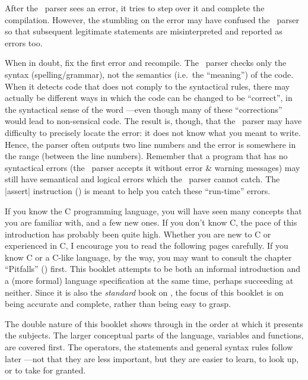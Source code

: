   After the \Small\ parser sees an error, it tries to step over
  it and complete the compilation. However, the stumbling on the error may have
  confused the \Small\ parser so that subsequent legitimate statements are
  misinterpreted and reported as errors too.

  When in doubt, fix the first error and recompile.
\list{\lbullet}
  The \Small\ parser checks only the syntax (spelling\slash grammar), not the
  semantics (i.e.\ the ``meaning'') of the code. When it detects code that does
  not comply to the syntactical rules, there may actually be different ways in
  which the code can be changed to be ``correct'', in the syntactical sense of
  the word ---even though many of these ``corrections'' would lead to non-sensical
  code. The result is, though, that the \Small\ parser may have difficulty to
  precisely locate the error: it does not know what you meant to write. Hence,
  the parser often outputs two line numbers and the error is
  somewhere in the range (between the line numbers).
\list{\lbullet}
  Remember that a program that has no syntactical errors (the \Small\ parser
  accepts it without error \& warning messages) may still have semantical and
  logical errors which the \Small\ parser cannot catch. The |assert| instruction
  () is meant to help you catch these ``run-time'' errors.
\endlist

\dingbatseparator

If you know the C programming language, you will have seen many concepts that
you are familiar with, and a few new ones. If you don't know C, the pace of
this introduction has probably been quite high. Whether you are new to C or
experienced in C, I encourage you to read the following pages carefully. If
you know C or a C-like language, by the way, you may want to consult the chapter
``Pitfalls'' () first.
This booklet attempts to be both an informal introduction and a (more formal)
language specification at the same time, perhaps succeeding at neither. Since
it is also the {\it standard\/} book on \Small, the focus of this booklet is on being
accurate and complete, rather than being easy to grasp.

The double nature of this booklet shows through in the order at which it
presents the subjects. The larger conceptual parts of the language, variables
and functions, are covered first. The operators, the statements and general
syntax rules follow later ---not that they are less important, but they are
easier to learn, to look up, or to take for granted.


